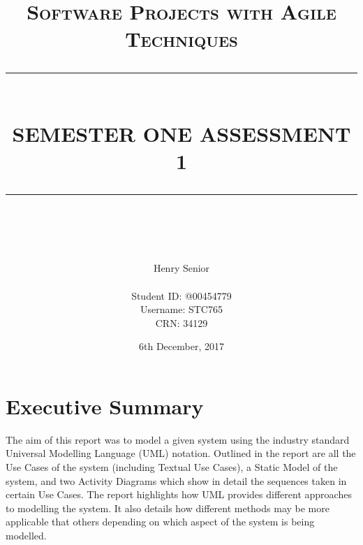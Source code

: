 \documentclass[a4paper,12pt]{article}
\newcommand{\HRule}[1]{\rule{\linewidth}{#1}}
\begin{document}
	
	\title{ \normalsize \textsc{Software Projects with Agile Techniques}
		\\ [2.0cm]
		\HRule{0.5pt} \\
		\LARGE \textbf{\uppercase{Semester One Assessment 1}}
		\HRule{2pt} \\ [0.5cm]}
	
	\date{6th December, 2017}
	
	\author{
		Henry Senior \\ \\
		Student ID: @00454779 \\ 
		Username: STC765 \\
		CRN: 34129
	}
	
\maketitle
\newpage

\section*{Executive Summary}
The aim of this report was to model a given system using the industry standard Universal Modelling Language (UML) notation. Outlined in the report are all the Use Cases of the system (including Textual Use Cases), a Static Model of the system, and two Activity Diagrams which show in detail the sequences taken in certain Use Cases. The report highlights how UML provides different approaches to modelling the system. It also details how different methods may be more applicable that others depending on which aspect of the system is being modelled. 

\tableofcontents
\newpage

\newpage

\newpage


\end{document}
